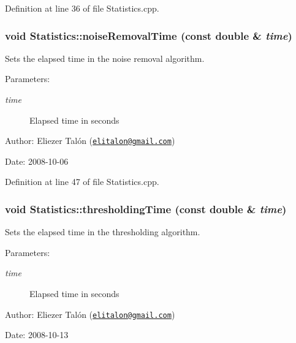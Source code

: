 Definition at line 36 of file Statistics.cpp.\hypertarget{class_statistics_4ad24aec4e5491b7d3afca143e6deb05}{
\subsubsection[noiseRemovalTime]{\setlength{\rightskip}{0pt plus 5cm}void Statistics::noiseRemovalTime (const double \& {\em time})}}
\label{class_statistics_4ad24aec4e5491b7d3afca143e6deb05}


Sets the elapsed time in the noise removal algorithm. 

\begin{Desc}
\item[Parameters:]
\begin{description}
\item[{\em time}]Elapsed time in seconds\end{description}
\end{Desc}
\begin{Desc}
\item[Author:]Eliezer Talón (\href{mailto:elitalon@gmail.com}{\tt elitalon@gmail.com}) \end{Desc}
\begin{Desc}
\item[Date:]2008-10-06 \end{Desc}


Definition at line 47 of file Statistics.cpp.\hypertarget{class_statistics_ca6e07bda50783e324e8c51d8c815019}{
\subsubsection[thresholdingTime]{\setlength{\rightskip}{0pt plus 5cm}void Statistics::thresholdingTime (const double \& {\em time})}}
\label{class_statistics_ca6e07bda50783e324e8c51d8c815019}


Sets the elapsed time in the thresholding algorithm. 

\begin{Desc}
\item[Parameters:]
\begin{description}
\item[{\em time}]Elapsed time in seconds\end{description}
\end{Desc}
\begin{Desc}
\item[Author:]Eliezer Talón (\href{mailto:elitalon@gmail.com}{\tt elitalon@gmail.com}) \end{Desc}
\begin{Desc}
\item[Date:]2008-10-13 \end{Desc}


